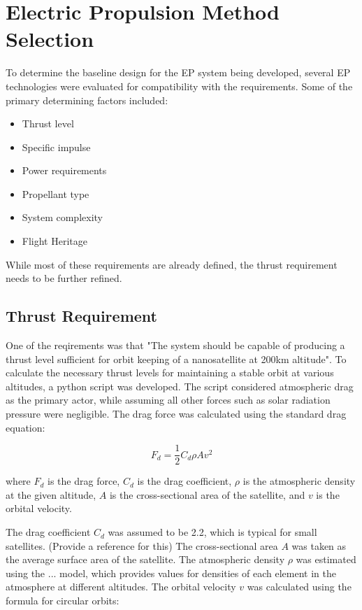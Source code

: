 \section{Electric Propulsion Method Selection}

To determine the baseline design for the \ac{EP} system being developed, several EP technologies were evaluated for compatibility with the requirements. Some of the primary determining factors included:

\begin{itemize}
    \item Thrust level
    \item Specific impulse
    \item Power requirements
    \item Propellant type
    \item System complexity
    \item Flight Heritage
\end{itemize}

While most of these requirements are already defined, the thrust requirement needs to be further refined.

\subsection{Thrust Requirement}
One of the reqirements was that "The system should be capable of producing a thrust level sufficient for orbit keeping of a nanosatellite at 200km altitude". To calculate the necessary thrust levels for maintaining a stable orbit at various altitudes, a python script was developed. The script considered atmospheric drag as the primary actor, while assuming all other forces such as solar radiation pressure were negligible. The drag force was calculated using the standard drag equation:

\begin{equation}
    F_d = \frac{1}{2} C_d \rho A v^2
\end{equation}

where \( F_d \) is the drag force, \( C_d \) is the drag coefficient, \( \rho \) is the atmospheric density at the given altitude, \( A \) is the cross-sectional area of the satellite, and \( v \) is the orbital velocity.

The drag coefficient \( C_d \) was assumed to be 2.2, which is typical for small satellites. (Provide a reference for this) 
The cross-sectional area \( A \) was taken as the average surface area of the satellite.
The atmospheric density \( \rho \) was estimated using the ... model, which provides values for densities of each element in the atmosphere at different altitudes.
The orbital velocity \( v \) was calculated using the formula for circular orbits:

